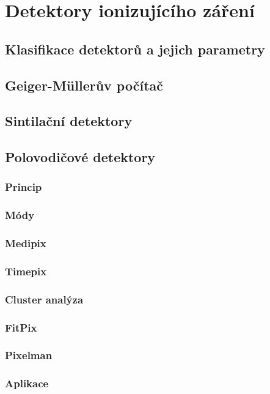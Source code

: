 

\chapter{Detektory ionizujícího záření}\label{det}

\section{Klasifikace detektorů a jejich parametry}


\section{Geiger-Müllerův počítač}


\section{Sintilační detektory}


\section{Polovodičové detektory}
\subsection{Princip}
\subsection{Módy}
\subsection{Medipix}\label{det:med}
\subsection{Timepix}\label{det:tim}
\subsection{Cluster analýza}\label{det:ca}
\subsection{FitPix}\label{det:fitpix}
\subsection{Pixelman}\label{det:pixelman}
\subsection{Aplikace}